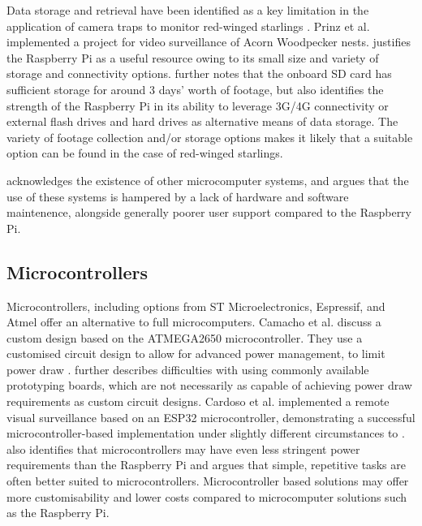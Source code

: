 \documentclass[class=report,11pt,crop=false]{standalone}
\begin{document}
Data storage and retrieval have been identified as a key limitation in the application of camera traps to monitor red-winged starlings \cite{hofmeyer2024private}. Prinz et al. \cite{prinz2016a} implemented a project for video surveillance of Acorn Woodpecker nests. \cite{prinz2016a} justifies the Raspberry Pi as a useful resource owing to its small size and variety of storage and connectivity options. \cite{prinz2016a} further notes that the onboard SD card has sufficient storage for around 3 days' worth of footage, but also identifies the strength of the Raspberry Pi in its ability to leverage 3G/4G connectivity or external flash drives and hard drives as alternative means of data storage.  The variety of footage collection and/or storage options makes it likely that a suitable option can be found in the case of red-winged starlings.

\cite{jolles2021broad-scale} acknowledges the existence of other microcomputer systems, and argues that the use of these systems is hampered by a lack of hardware and software maintenence, alongside generally poorer user support compared to the Raspberry Pi. 

\subsection{Microcontrollers}

Microcontrollers, including options from ST Microelectronics, Espressif, and Atmel offer an alternative to full microcomputers. Camacho et al. \cite{camacho2017deployment} discuss a custom design based on the ATMEGA2650 microcontroller. They use a customised circuit design to allow for advanced power management, to limit power draw \cite{camacho2017deployment}. \cite{camacho2017deployment} further describes difficulties with using commonly available prototyping boards, which are not necessarily as capable of achieving power draw requirements as custom circuit designs. Cardoso et al. \cite{cardoso2022internet} implemented a remote visual surveillance based on an ESP32 microcontroller, demonstrating a successful microcontroller-based implementation under slightly different circumstances to \cite{camacho2017deployment}. \cite{jolles2021broad-scale} also identifies that microcontrollers may have even less stringent power requirements than the Raspberry Pi and argues that simple, repetitive tasks are often better suited to microcontrollers. Microcontroller based solutions may offer more customisability and lower costs compared to microcomputer solutions such as the Raspberry Pi.
\end{document}
